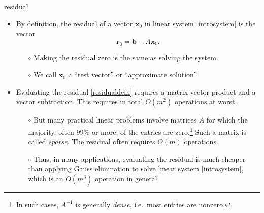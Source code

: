 \documentclass[10pt,hyperref]{beamer}
\newcommand{\bb}{\mathbf{b}}
\newcommand{\br}{\mathbf{r}}
\newcommand{\bx}{\mathbf{x}}
\begin{document}
\begin{frame}{residual}

\begin{itemize}
\item By definition, the residual of a vector $\bx_0$ in linear system \eqref{introsystem} is the vector
\begin{equation}
\br_0 = \bb - A \bx_0. \label{residualdefn}
\end{equation}
  \vspace{-5mm}
  \begin{itemize}
  \item[$\circ$] Making the residual zero is the same as solving the system.
  \item[$\circ$] We call $\bx_0$ a ``test vector'' or ``approximate solution''.
  \end{itemize}

\bigskip
\item Evaluating the residual \eqref{residualdefn} requires a matrix-vector product and a vector subtraction.  This requires in total $O(m^2)$ operations at worst.
  \begin{itemize}
  \item[$\circ$] But many practical linear problems involve matrices $A$ for which the majority, often $99\%$ or more, of the entries are zero.\footnote{In such cases, $A^{-1}$ is generally \emph{dense}, i.e.~most entries are nonzero.}  Such a matrix is called \emph{sparse}.  The residual often requires $O(m)$ operations.
  \item[$\circ$] Thus, in many applications, evaluating the residual is much cheaper than applying Gauss elimination to solve linear system \eqref{introsystem}, which is an $O(m^3)$ operation in general.
  \end{itemize}
\end{itemize}
\end{frame}
\end{document}
